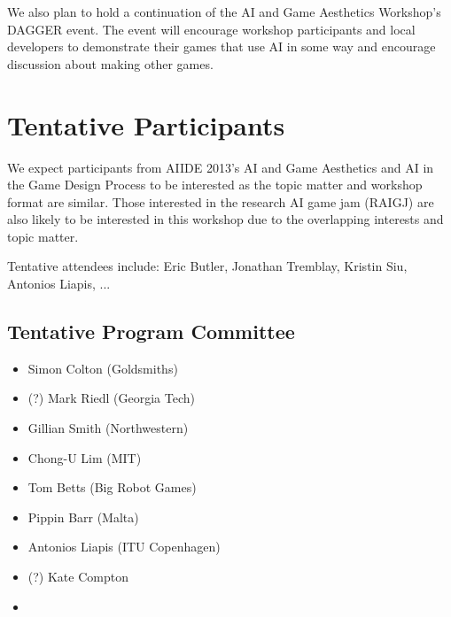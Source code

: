 \documentclass[10pt,a4paper]{article}
\begin{document}
We also plan to hold a continuation of the AI and Game Aesthetics Workshop's DAGGER event.
The event will encourage workshop participants and local developers to demonstrate their games that use AI in some way and encourage discussion about making other games.



\section{Tentative Participants}
We expect participants from AIIDE 2013's AI and Game Aesthetics and AI in the Game Design Process to be interested as the topic matter and workshop format are similar.
Those interested in the research AI game jam (RAIGJ) are also likely to be interested in this workshop due to the overlapping interests and topic matter.

Tentative attendees include: Eric Butler, Jonathan Tremblay, Kristin Siu, Antonios Liapis, ...

\subsection*{Tentative Program Committee}
\begin{itemize}
\itemsep0em
\item Simon Colton (Goldsmiths)
\item (?) Mark Riedl (Georgia Tech)
\item Gillian Smith (Northwestern)
\item Chong-U Lim (MIT)
\item Tom Betts (Big Robot Games)
\item Pippin Barr (Malta)
\item Antonios Liapis (ITU Copenhagen)
\item (?) Kate Compton
\item 
\end{itemize}
\end{document}
